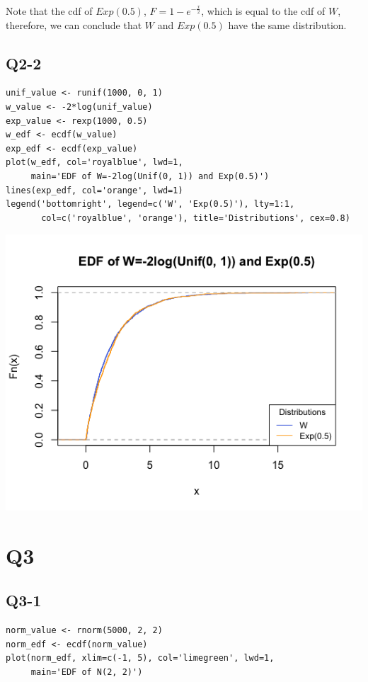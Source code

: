 \documentclass[12pt,letterpaper]{article}
\begin{document}
\noindent Note that the cdf of $Exp(0.5)$, $F = 1 - e^{- \frac{x}{2}}$, which is equal to the cdf of $W$, therefore, we can conclude that $W$ and $Exp(0.5)$ have the same distribution. 

\pagebreak
\subsection*{Q2-2}
\begin{verbatim}
unif_value <- runif(1000, 0, 1)
w_value <- -2*log(unif_value)
exp_value <- rexp(1000, 0.5)
w_edf <- ecdf(w_value)
exp_edf <- ecdf(exp_value)
plot(w_edf, col='royalblue', lwd=1, 
     main='EDF of W=-2log(Unif(0, 1)) and Exp(0.5)')
lines(exp_edf, col='orange', lwd=1)
legend('bottomright', legend=c('W', 'Exp(0.5)'), lty=1:1, 
       col=c('royalblue', 'orange'), title='Distributions', cex=0.8)
\end{verbatim}

\includegraphics[width=150mm]{plot_edf.png}

\pagebreak
\section*{Q3}
\subsection*{Q3-1}

\begin{verbatim}
norm_value <- rnorm(5000, 2, 2)
norm_edf <- ecdf(norm_value)
plot(norm_edf, xlim=c(-1, 5), col='limegreen', lwd=1,
     main='EDF of N(2, 2)')
\end{verbatim}
\end{document}

